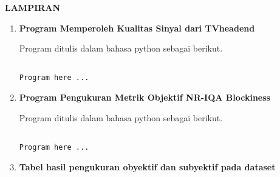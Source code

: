 \begin{center}
\begin{large}\textbf{LAMPIRAN}\\\end{large}
\end{center}
\begin{enumerate}
\item  \textbf{Program Memperoleh Kualitas Sinyal dari TVheadend} 

Program ditulis dalam bahasa python sebagai berikut.

\begin{verbatim}

Program here ...

\end{verbatim}


\item  \textbf{Program Pengukuran Metrik Objektif NR-IQA Blockiness} 

Program ditulis dalam bahasa python sebagai berikut.

\begin{verbatim}

Program here ...

\end{verbatim}


\item  \textbf{Tabel hasil pengukuran obyektif dan subyektif pada dataset} 
	

\end{enumerate}
